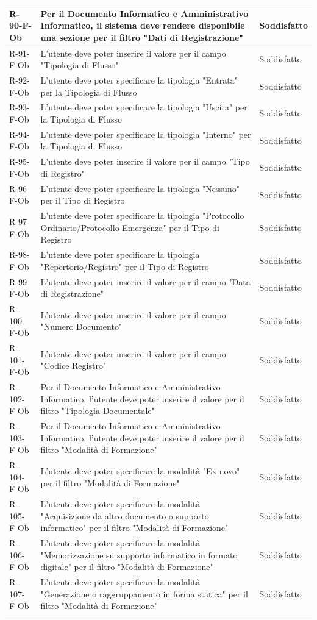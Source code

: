 \begin{longtable}{|p{2.5cm}|p{9.5cm}|p{2.5cm}|}
\hline
R-90-F-Ob & Per il Documento Informatico e Amministrativo Informatico, il sistema deve rendere disponibile una sezione per il filtro "Dati di Registrazione" & Soddisfatto \\
\hline
R-91-F-Ob & L'utente deve poter inserire il valore per il campo "Tipologia di Flusso" & Soddisfatto \\
\hline
R-92-F-Ob & L'utente deve poter specificare la tipologia "Entrata" per la Tipologia di Flusso & Soddisfatto \\
\hline
R-93-F-Ob & L'utente deve poter specificare la tipologia "Uscita" per la Tipologia di Flusso & Soddisfatto \\
\hline
R-94-F-Ob & L'utente deve poter specificare la tipologia "Interno" per la Tipologia di Flusso & Soddisfatto \\
\hline
R-95-F-Ob & L'utente deve poter inserire il valore per il campo "Tipo di Registro" & Soddisfatto \\
\hline
R-96-F-Ob & L'utente deve poter specificare la tipologia "Nessuno" per il Tipo di Registro & Soddisfatto \\
\hline
R-97-F-Ob & L'utente deve poter specificare la tipologia "Protocollo Ordinario/Protocollo Emergenza" per il Tipo di Registro & Soddisfatto \\
\hline
R-98-F-Ob & L'utente deve poter specificare la tipologia "Repertorio/Registro" per il Tipo di Registro & Soddisfatto \\
\hline
R-99-F-Ob & L'utente deve poter inserire il valore per il campo "Data di Registrazione" & Soddisfatto \\
\hline
R-100-F-Ob & L'utente deve poter inserire il valore per il campo "Numero Documento" & Soddisfatto \\
\hline
R-101-F-Ob & L'utente deve poter inserire il valore per il campo "Codice Registro" & Soddisfatto \\
\hline

R-102-F-Ob & Per il Documento Informatico e Amministrativo Informatico, l'utente deve poter inserire il valore per il filtro "Tipologia Documentale" & Soddisfatto \\
\hline

R-103-F-Ob & Per il Documento Informatico e Amministrativo Informatico, l'utente deve poter inserire il valore per il filtro "Modalità di Formazione" & Soddisfatto \\
\hline
R-104-F-Ob & L'utente deve poter specificare la modalità "Ex novo" per il filtro "Modalità di Formazione" & Soddisfatto \\
\hline
R-105-F-Ob & L'utente deve poter specificare la modalità "Acquisizione da altro documento o supporto informatico" per il filtro "Modalità di Formazione" & Soddisfatto \\
\hline
R-106-F-Ob & L'utente deve poter specificare la modalità "Memorizzazione su supporto informatico in formato digitale" per il filtro "Modalità di Formazione" & Soddisfatto \\
\hline
R-107-F-Ob & L'utente deve poter specificare la modalità "Generazione o raggruppamento in forma statica" per il filtro "Modalità di Formazione" & Soddisfatto \\


\end{longtable}
